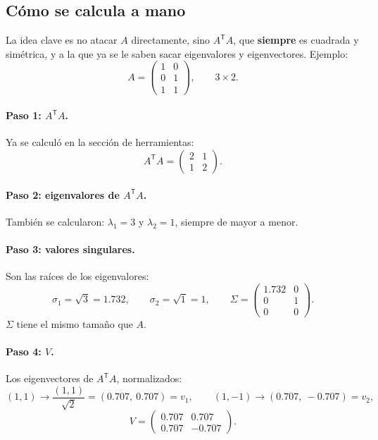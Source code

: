 \documentclass[11pt,letterpaper]{article}
\newcommand{\T}{^{\mathsf{T}}}
\newcommand{\raiz}[1]{\sqrt{#1}}
\begin{document}
\subsection*{Cómo se calcula a mano}

La idea clave es no atacar $A$ directamente, sino $A\T A$, que
\textbf{siempre} es cuadrada y simétrica, y a la que ya se le saben
sacar eigenvalores y eigenvectores. Ejemplo:
\[
    A = \begin{pmatrix} 1 & 0 \\ 0 & 1 \\ 1 & 1 \end{pmatrix},
    \qquad 3 \times 2 .
\]

\paragraph{Paso 1: $A\T A$.} Ya se calculó en la sección de
herramientas:
\[
    A\T A = \begin{pmatrix} 2 & 1 \\ 1 & 2 \end{pmatrix} .
\]

\paragraph{Paso 2: eigenvalores de $A\T A$.} También se calcularon:
$\lambda_1 = 3$ y $\lambda_2 = 1$, siempre de mayor a menor.

\paragraph{Paso 3: valores singulares.} Son las raíces de los
eigenvalores:
\[
    \sigma_1 = \raiz{3} = 1.732, \qquad \sigma_2 = \raiz{1} = 1,
    \qquad
    \Sigma = \begin{pmatrix} 1.732 & 0 \\ 0 & 1 \\ 0 & 0
             \end{pmatrix} .
\]
$\Sigma$ tiene el mismo tamaño que $A$.

\paragraph{Paso 4: $V$.} Los eigenvectores de $A\T A$, normalizados:
\[
    (1, 1) \to \frac{(1, 1)}{\raiz{2}} = (0.707,\ 0.707) = v_1,
    \qquad
    (1, -1) \to (0.707,\ -0.707) = v_2,
\]
\[
    V = \begin{pmatrix} 0.707 & 0.707 \\ 0.707 & -0.707 \end{pmatrix} .
\]
\end{document}
